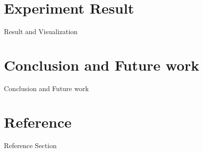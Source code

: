 \documentclass[12pt]{article}
\begin{document}
\section{Experiment Result}
Result and Visualization\\


\section{Conclusion and Future work}
Conclusion and Future work\\


\section*{Reference}
Reference Section\\



\end{document}
